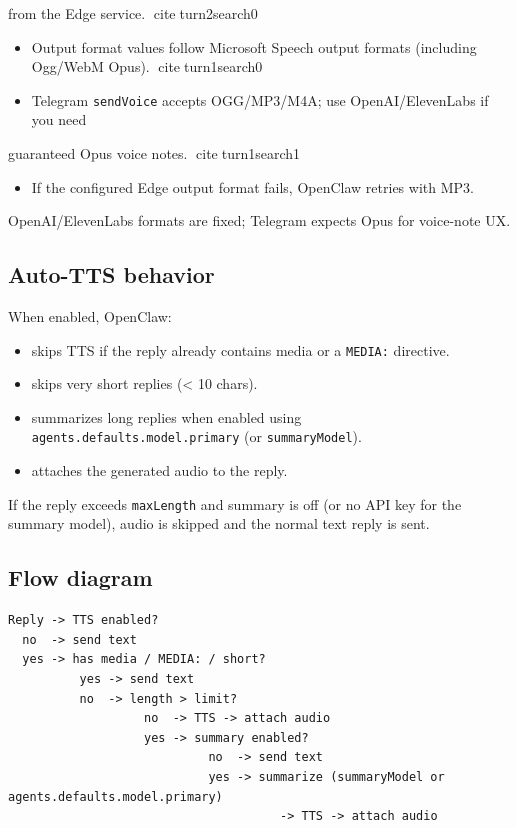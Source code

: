 from the Edge service. citeturn2search0
\begin{itemize}
  \item Output format values follow Microsoft Speech output formats (including Ogg/WebM Opus). citeturn1search0
  \item Telegram \texttt{sendVoice} accepts OGG/MP3/M4A; use OpenAI/ElevenLabs if you need
\end{itemize}

guaranteed Opus voice notes. citeturn1search1
\begin{itemize}
  \item If the configured Edge output format fails, OpenClaw retries with MP3.
\end{itemize}


OpenAI/ElevenLabs formats are fixed; Telegram expects Opus for voice-note UX.

\subsection{Auto-TTS behavior}


When enabled, OpenClaw:

\begin{itemize}
  \item skips TTS if the reply already contains media or a \texttt{MEDIA:} directive.
  \item skips very short replies (< 10 chars).
  \item summarizes long replies when enabled using \texttt{agents.defaults.model.primary} (or \texttt{summaryModel}).
  \item attaches the generated audio to the reply.
\end{itemize}


If the reply exceeds \texttt{maxLength} and summary is off (or no API key for the
summary model), audio
is skipped and the normal text reply is sent.

\subsection{Flow diagram}


\begin{lstlisting}
Reply -> TTS enabled?
  no  -> send text
  yes -> has media / MEDIA: / short?
          yes -> send text
          no  -> length > limit?
                   no  -> TTS -> attach audio
                   yes -> summary enabled?
                            no  -> send text
                            yes -> summarize (summaryModel or agents.defaults.model.primary)
                                      -> TTS -> attach audio
\end{lstlisting}



